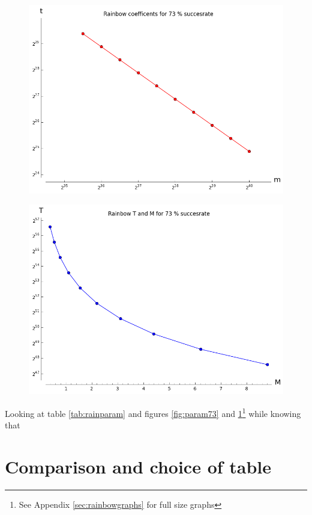 \begin{figure}[H]
  \centering
  \begin{minipage}{.5\textwidth}
    \centering
    \includegraphics[scale=0.3]{figures/RainbowCoef73.png}
    \label{fig:param73}
  \end{minipage}%
  \begin{minipage}{.5\textwidth}
    \centering
    \includegraphics[scale=0.3]{figures/RainbowTime73.png}
    \label{fig:time73}
  \end{minipage}
\end{figure}

Looking at table \ref{tab:rainparam} and figures \ref{fig:param73}
and \ref{fig:time73}\footnote{See Appendix \ref{sec:rainbowgraphs} for
  full size graphs} while knowing that 

\newpage
\section{Comparison and choice of table}

